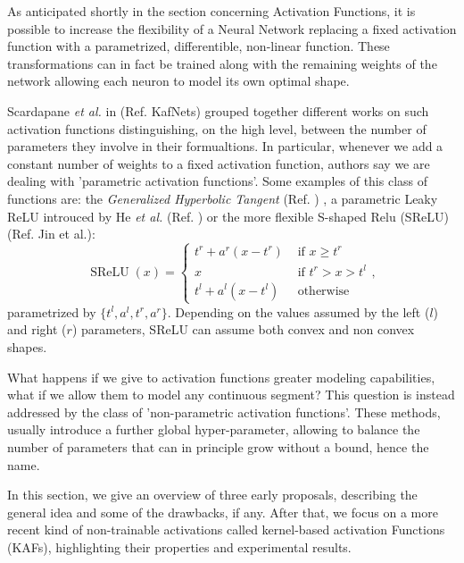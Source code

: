 \documentclass[LaM,binding=0.6cm]{./packages/sapthesis/sapthesis}
\begin{document}
    As anticipated shortly in the section concerning Activation Functions, it is possible to increase the flexibility of a Neural Network replacing a fixed activation function with a parametrized, differentible, non-linear function.
    These transformations can in fact be trained along with the remaining weights of the network allowing each neuron to model its own optimal shape.

    Scardapane \textit{et al.} in (Ref. KafNets) grouped together different works on such activation functions distinguishing, on the high level, between the number of parameters they involve in their formualtions.
    In particular, whenever we add a constant number of weights to a fixed activation function, authors say we are dealing with 'parametric activation functions'. Some examples of this class of functions are: the \textit{Generalized Hyperbolic Tangent} (Ref. )
    , a parametric Leaky ReLU introuced by He \textit{et al.} (Ref. ) or the more flexible S-shaped Relu (SReLU) (Ref.  Jin et al.):
    \begin{equation}
        \label{srelu}
        \operatorname{SReLU}(x)=\left\{\begin{array}{ll}
            t^{r}+a^{r}\left(x-t^{r}\right) & \text { if } x \geq t^{r} \\
            x & \text { if } t^{r}>x>t^{l} \\
            t^{l}+a^{l}\left(x-t^{l}\right) & \text { otherwise }
            \end{array}\right.
            ,
    \end{equation}
    parametrized by $\{t^l,a^l,t^r,a^r\}$. Depending on the values assumed by the left ($l$) and right ($r$) parameters, SReLU can assume both convex and non convex shapes.

    What happens if we give to activation functions greater modeling capabilities, what if we allow them to model any continuous segment? This question is instead addressed by the class of 'non-parametric activation functions'. These methods,
    usually introduce a further global hyper-parameter, allowing to balance the number of parameters that can in principle grow without a bound, hence the name.

    In this section, we give an overview of three early proposals, describing the general idea and some of the drawbacks, if any. After that, we focus on a more recent kind of non-trainable activations called kernel-based activation Functions
    (KAFs), highlighting their properties and experimental results.
\end{document}
